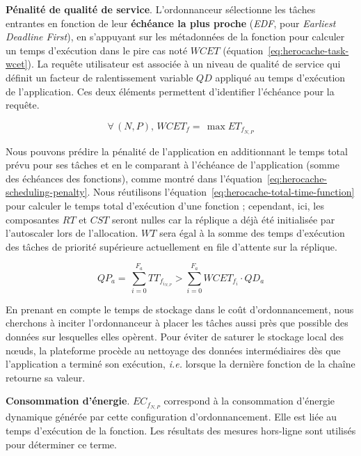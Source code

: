 {\textbf{Pénalité de qualité de service}. L'ordonnanceur sélectionne les tâches entrantes en fonction de leur \textbf{échéance la plus proche} (\textit{EDF}, pour \textit{Earliest Deadline First}), en s'appuyant sur les métadonnées de la fonction pour calculer un temps d'exécution dans le pire cas noté $WCET$ (équation~\ref{eq:herocache-task-wcet}). La requête utilisateur est associée à un niveau de qualité de service qui définit un facteur de ralentissement variable $QD$ appliqué au temps d'exécution de l'application. Ces deux éléments permettent d'identifier l'échéance pour la requête.

\begin{equation}
    \forall \, (N, P), \, WCET_{f} = \, \max ET_{f_{N, P}}
\label{eq:herocache-task-wcet}
\end{equation}

Nous pouvons prédire la pénalité de l'application en additionnant le temps total prévu pour ses tâches et en le comparant à l'échéance de l'application (somme des échéances des fonctions), comme montré dans l'équation~\ref{eq:herocache-scheduling-penalty}. Nous réutilisons l'équation~\ref{eq:herocache-total-time-function} pour calculer le temps total d'exécution d'une fonction ; cependant, ici, les composantes $RT$ et $CST$ seront nulles car la réplique a déjà été initialisée par l'autoscaler lors de l'allocation. $WT$ sera égal à la somme des temps d'exécution des tâches de priorité supérieure actuellement en file d'attente sur la réplique.

\begin{equation}
   QP_{a} = \, \sum_{i = 0}^{F_a} TT_{{f}_{{i}_{N, P}}} > \sum_{i = 0}^{F_a} WCET_{f_{i}} \cdot QD_{a}
\label{eq:herocache-scheduling-penalty}
\end{equation}

En prenant en compte le temps de stockage dans le coût d'ordonnancement, nous cherchons à inciter l'ordonnanceur à placer les tâches aussi près que possible des données sur lesquelles elles opèrent. Pour éviter de saturer le stockage local des nœuds, la plateforme procède au nettoyage des données intermédiaires dès que l'application a terminé son exécution, \textit{i.e.} lorsque la dernière fonction de la chaîne retourne sa valeur.

\textbf{Consommation d'énergie}. ${EC}_{{f}_{N, P}}$ correspond à la consommation d'énergie dynamique générée par cette configuration d'ordonnancement. Elle est liée au temps d'exécution de la fonction. Les résultats des mesures hors-ligne sont utilisés pour déterminer ce terme.

}
